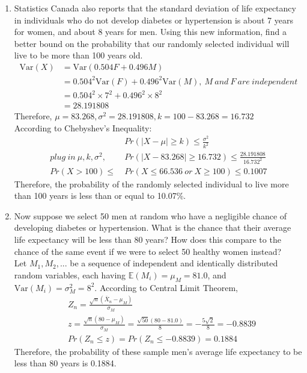 \documentclass[11pt]{article}
\newcommand{\e}{\mathbb{E}}
\newcommand{\var}{\text{Var}}
\begin{document}
\begin{enumerate}[label=\textbf{Question \arabic*:},start=1]
\begin{enumerate}
  \item Statistics Canada also reports that the standard deviation of life expectancy in individuals who do not develop diabetes or hypertension is about 7 years for women, and about 8 years for men. Using this new information, find a better bound on the probability that our randomly selected individual will live to be more than 100 years old.
  \begin{align*}
  \var(X) & = \var(0.504F + 0.496M) \\
  & = 0.504^2 \var(F) + 0.496^2 \var(M),\ M\ and\ F\ are\ independent \\
  & = 0.504^2 \times 7^2 + 0.496^2 \times 8^2 \\
  & = 28.191808
  \end{align*}
  Therefore, $\mu = 83.268, \sigma^2 = 28.191808, k = 100 - 83.268 = 16.732$\\
  According to Chebyshev's Inequality:
  \begin{align*}
  & Pr(|X-\mu| \geq k) \leq \frac{\sigma^2}{k^2} \\ 
  plug\ in\ \mu, k, \sigma^2,\ & Pr(|X - 83.268| \geq 16.732) \leq \frac{28.191808}{16.732^2} \\
  Pr(X > 100) \leq \ & Pr(X \leq 66.536\ or\ X \geq 100) \leq 0.1007
  \end{align*}
  Therefore, the probability of the randomly selected individual to live more than 100 years is less than or equal to 10.07\%.\\

  \item Now suppose we select 50 men at random who have a negligible chance of developing diabetes or hypertension. What is the chance that their average life expectancy will be less than 80 years? How does this compare to the chance of the same event if we were to select 50 healthy women instead? \\
  
  Let $M_1, M_2, ... $ be a sequence of independent and identically distributed random variables, each having $\e(M_i) = \mu_M = 81.0$, and $\var(M_i) = \sigma_M^2 = 8^2$. According to Central Limit Theorem,
  \begin{align*}
  & Z_{n} = \frac{\sqrt{n}(\bar{X}_n - \mu_M)}{\sigma_M} \\
  & z = \frac{\sqrt{n}(80 - \mu_M)}{\sigma_M} = \frac{\sqrt{50} (80 - 81.0)}{8} = - \frac{5\sqrt{2}}{8} = -0.8839 \\
  & Pr(Z_n \leq z) = Pr(Z_n \leq -0.8839) = 0.1884
  \end{align*}
  Therefore, the probability of these sample men's average life expectancy to be less than 80 years is 0.1884.\\
  

\end{enumerate}
\end{enumerate}
\end{document}
